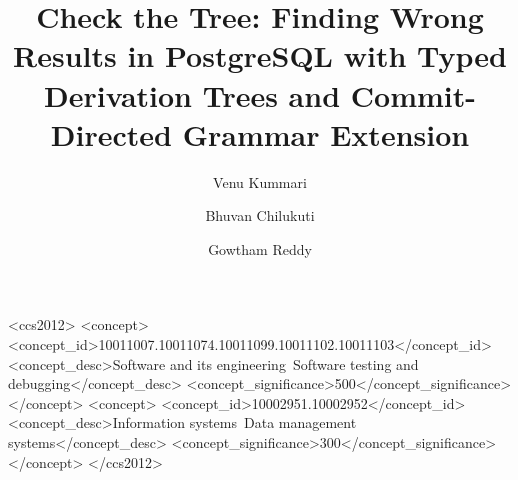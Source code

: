 \documentclass[sigconf,screen]{acmart}
\begin{document}
\title[Check the Tree]{Check the Tree: Finding Wrong Results in PostgreSQL with Typed Derivation Trees and Commit-Directed Grammar Extension}

\author{Venu Kummari}
\author{Bhuvan Chilukuti}
\author{Gowtham Reddy}
\renewcommand{\shortauthors}{Kummari, Chilukuti, and Reddy}

\begin{abstract}

\end{abstract}

\begin{CCSXML}
<ccs2012>
  <concept>
    <concept_id>10011007.10011074.10011099.10011102.10011103</concept_id>
    <concept_desc>Software and its engineering~Software testing and debugging</concept_desc>
    <concept_significance>500</concept_significance>
  </concept>
  <concept>
    <concept_id>10002951.10002952</concept_id>
    <concept_desc>Information systems~Data management systems</concept_desc>
    <concept_significance>300</concept_significance>
  </concept>
</ccs2012>
\end{CCSXML}


\maketitle















\end{document}
